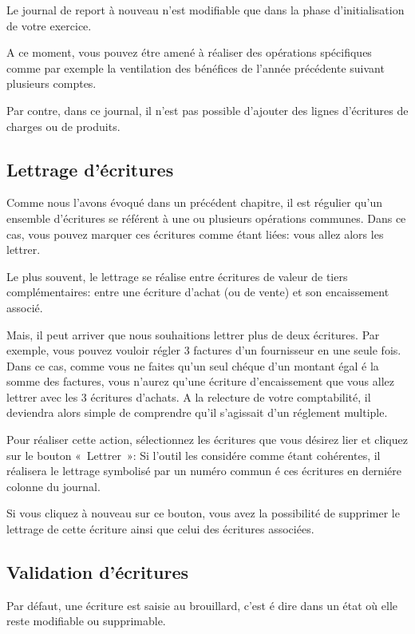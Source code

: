 \documentclass[a4paper,10pt,oneside,french]{sphinxmanual}
\begin{document}
Le journal de report à nouveau n’est modifiable que dans la phase d’initialisation de votre exercice.

A ce moment, vous pouvez étre amené à réaliser des opérations spécifiques comme par exemple la ventilation des bénéfices de l’année
précédente suivant plusieurs comptes.

Par contre, dans ce journal, il n’est pas possible d’ajouter des lignes d’écritures de charges ou de produits.


\subsection{Lettrage d’écritures}
\label{\detokenize{accounting/entity:lettrage-d-ecritures}}
Comme nous l’avons évoqué dans un précédent chapitre, il est régulier
qu’un ensemble d’écritures se référent à une ou plusieurs opérations
communes. Dans ce cas, vous pouvez marquer ces écritures comme étant
liées: vous allez alors les lettrer.

Le plus souvent, le lettrage
se réalise entre écritures de valeur de tiers complémentaires: entre
une écriture d’achat (ou de vente) et son encaissement associé.

Mais, il peut arriver que nous souhaitions lettrer plus de deux
écritures. Par exemple, vous pouvez vouloir régler 3 factures d’un
fournisseur en une seule fois. Dans ce cas, comme vous ne faites qu’un
seul chéque d’un montant égal é la somme des factures, vous n’aurez
qu’une écriture d’encaissement que vous allez lettrer avec les 3
écritures d’achats. A la relecture de votre comptabilité, il deviendra
alors simple de comprendre qu’il s’agissait d’un réglement multiple.

Pour réaliser cette action, sélectionnez les écritures que vous désirez
lier et cliquez sur le bouton « Lettrer »: Si l’outil les considére comme
étant cohérentes, il réalisera le lettrage symbolisé par un numéro
commun é ces écritures en derniére colonne du journal.

Si vous cliquez à nouveau sur ce bouton, vous avez la possibilité de supprimer
le lettrage de cette écriture ainsi que celui des écritures associées.


\subsection{Validation d’écritures}
\label{\detokenize{accounting/entity:validation-d-ecritures}}
Par défaut, une écriture est saisie au brouillard, c’est é dire dans un
état où elle reste modifiable ou supprimable.
\end{document}

